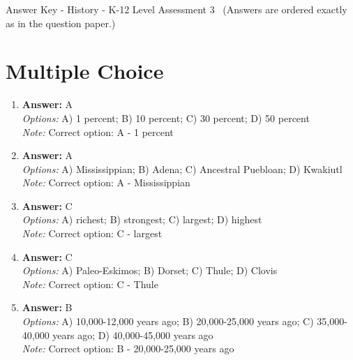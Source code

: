 \documentclass[12pt]{article}
\begin{document}
\begin{center}
Answer Key - History - K-12 Level Assessment 3 \
\small (Answers are ordered exactly as in the question paper.)
\end{center}

\section*{Multiple Choice}
\begin{enumerate}[label=\arabic*.]
\item \textbf{Answer:} A
\\ \textit{Options:} A) 1 percent; B) 10 percent; C) 30 percent; D) 50 percent
\\ \textit{Note:} Correct option: A - 1 percent
\item \textbf{Answer:} A
\\ \textit{Options:} A) Mississippian; B) Adena; C) Ancestral Puebloan; D) Kwakiutl
\\ \textit{Note:} Correct option: A - Mississippian
\item \textbf{Answer:} C
\\ \textit{Options:} A) richest; B) strongest; C) largest; D) highest
\\ \textit{Note:} Correct option: C - largest
\item \textbf{Answer:} C
\\ \textit{Options:} A) Paleo-Eskimos; B) Dorset; C) Thule; D) Clovis
\\ \textit{Note:} Correct option: C - Thule
\item \textbf{Answer:} B
\\ \textit{Options:} A) 10,000-12,000 years ago; B) 20,000-25,000 years ago; C) 35,000-40,000 years ago; D) 40,000-45,000 years ago
\\ \textit{Note:} Correct option: B - 20,000-25,000 years ago
\end{enumerate}
\end{document}
